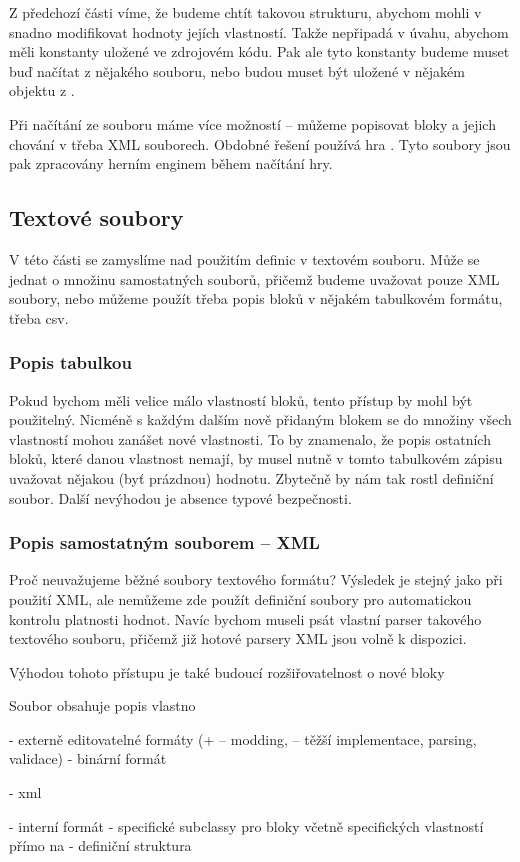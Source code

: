 Z předchozí části víme, že budeme chtít takovou strukturu, abychom mohli v \UE{} snadno modifikovat hodnoty jejích vlastností. Takže nepřipadá v úvahu, abychom měli konstanty uložené ve zdrojovém kódu. Pak ale tyto konstanty budeme muset buď načítat z nějakého souboru, nebo budou muset být uložené v nějakém objektu z \UE{}.

Při načítání ze souboru máme více možností -- můžeme popisovat bloky a jejich chování v třeba XML souborech. Obdobné řešení používá hra \ME{}. Tyto soubory jsou pak zpracovány herním enginem během načítání hry. 

\subsection{Textové soubory}
V této části se zamyslíme nad použitím definic v textovém souboru. Může se jednat o množinu samostatných souborů, přičemž budeme uvažovat pouze XML soubory, nebo můžeme použít třeba popis bloků v nějakém tabulkovém formátu, třeba csv.

\subsubsection{Popis tabulkou}
Pokud bychom měli velice málo vlastností bloků, tento přístup by mohl být použitelný. Nicméně s každým dalším nově přidaným blokem se do množiny všech vlastností mohou zanášet nové vlastnosti.  To by znamenalo, že popis ostatních bloků, které danou vlastnost nemají, by musel nutně v tomto tabulkovém zápisu uvažovat nějakou (byť prázdnou) hodnotu. Zbytečně by nám tak rostl definiční soubor. Další nevýhodou je absence typové bezpečnosti. 

\subsubsection{Popis samostatným souborem -- XML}
Proč neuvažujeme běžné soubory textového formátu? Výsledek je stejný jako při použití XML, ale nemůžeme zde použít definiční soubory pro automatickou kontrolu platnosti hodnot. Navíc bychom museli psát vlastní parser takového textového souboru, přičemž již hotové parsery XML jsou volně k dispozici. 

Výhodou tohoto přístupu je také budoucí rozšiřovatelnost o nové bloky

Soubor obsahuje popis vlastno

- externě editovatelné formáty (+ -- modding, -- těžší implementace, parsing, validace)
- binární formát

- xml


- interní formát
- specifické subclassy pro bloky včetně specifických vlastností přímo na 
- definiční struktura





